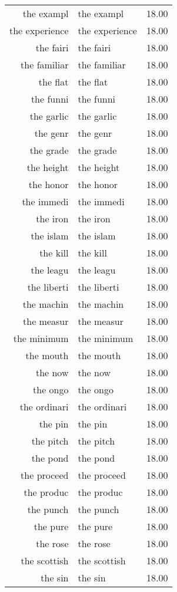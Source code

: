 \begin{table}[ht]
\begin{tabular}{rlr}
  the exampl & the exampl & 18.00 \\ 
  the experience & the experience & 18.00 \\ 
  the fairi & the fairi & 18.00 \\ 
  the familiar & the familiar & 18.00 \\ 
  the flat & the flat & 18.00 \\ 
  the funni & the funni & 18.00 \\ 
  the garlic & the garlic & 18.00 \\ 
  the genr & the genr & 18.00 \\ 
  the grade & the grade & 18.00 \\ 
  the height & the height & 18.00 \\ 
  the honor & the honor & 18.00 \\ 
  the immedi & the immedi & 18.00 \\ 
  the iron & the iron & 18.00 \\ 
  the islam & the islam & 18.00 \\ 
  the kill & the kill & 18.00 \\ 
  the leagu & the leagu & 18.00 \\ 
  the liberti & the liberti & 18.00 \\ 
  the machin & the machin & 18.00 \\ 
  the measur & the measur & 18.00 \\ 
  the minimum & the minimum & 18.00 \\ 
  the mouth & the mouth & 18.00 \\ 
  the now & the now & 18.00 \\ 
  the ongo & the ongo & 18.00 \\ 
  the ordinari & the ordinari & 18.00 \\ 
  the pin & the pin & 18.00 \\ 
  the pitch & the pitch & 18.00 \\ 
  the pond & the pond & 18.00 \\ 
  the proceed & the proceed & 18.00 \\ 
  the produc & the produc & 18.00 \\ 
  the punch & the punch & 18.00 \\ 
  the pure & the pure & 18.00 \\ 
  the rose & the rose & 18.00 \\ 
  the scottish & the scottish & 18.00 \\ 
  the sin & the sin & 18.00 \\ 

\end{tabular}
\end{table}
